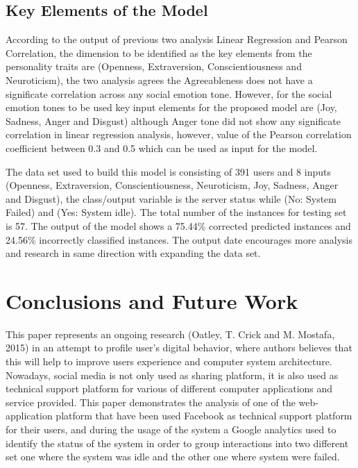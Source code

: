 \documentclass[graybox]{svmult}
\begin{document}
\subsection{Key Elements of the Model}

According to the output of previous two analysis Linear Regression and
Pearson Correlation, the dimension to be identified as the key
elements from the personality traits are (Openness, Extraversion,
Conscientiousness and Neuroticism), the two analysis agrees the
Agreeableness does not have a significate correlation across any
social emotion tone. However, for the social emotion tones to be used
key input elements for the proposed model are (Joy, Sadness, Anger and
Disgust) although Anger tone did not show any significate correlation
in linear regression analysis, however, value of the Pearson
correlation coefficient between 0.3 and 0.5 which can be used as input
for the model.


The data set used to build this model is consisting of 391 users and 8
inputs (Openness, Extraversion, Conscientiousness, Neuroticism, Joy,
Sadness, Anger and Disgust), the class/output variable is the server
status while (No: System Failed) and (Yes: System idle). The total
number of the instances for testing set is 57. The output of the model
shows a 75.44\% corrected predicted instances and 24.56\% incorrectly
classified instances. The output date encourages more analysis and
research in same direction with expanding the data set.



\section{Conclusions and Future Work}\label{conclusions}

This paper represents an ongoing research (Oatley, T. Crick and
M. Mostafa, 2015) in an attempt to profile user’s digital behavior,
where authors believes that this will help to improve users experience
and computer system architecture. Nowadays, social media is not only
used as sharing platform, it is also used as technical support
platform for various of different computer applications and service
provided. This paper demonstrates the analysis of one of the
web-application platform that have been used Facebook as technical
support platform for their users, and during the usage of the system a
Google analytics used to identify the status of the system in order to
group interactions into two different set one where the system was
idle and the other one where system were failed.
\end{document}
